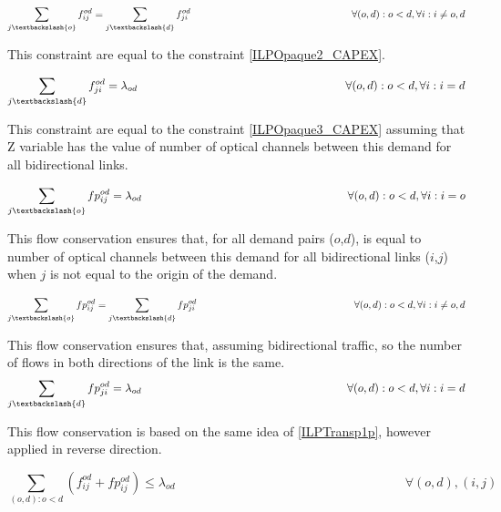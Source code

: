 \begin{equation}
\sum_{j\textbackslash \{o\}} f_{ij}^{od} = \sum_{j\textbackslash \{d\}} f_{ji}^{od} \qquad \qquad \qquad \qquad \qquad \qquad \qquad \qquad
\forall(o,d) : o < d, \forall i: i \neq o,d
\label{ILPTransp2}
\end{equation}

This constraint are equal to the constraint \ref{ILPOpaque2_CAPEX}.

\begin{equation}
\sum_{j\textbackslash \{d\}} f_{ji}^{od} = \lambda_{od}  \qquad \qquad \qquad \qquad \qquad \qquad \qquad \qquad \qquad
\forall(o,d) : o < d, \forall i: i = d
\label{ILPTransp3}
\end{equation}

This constraint are equal to the constraint \ref{ILPOpaque3_CAPEX} assuming that Z variable has the value of number of optical channels between this demand for all bidirectional links.

\begin{equation}
\sum_{j\textbackslash \{o\}} fp_{ij}^{od} = \lambda_{od} \qquad \qquad \qquad \qquad \qquad \qquad \qquad \qquad \qquad
\forall(o,d) : o < d, \forall i: i = o
\label{ILPTransp1p}
\end{equation}

This flow conservation ensures that, for all demand pairs ($o$,$d$), is equal to number of optical channels between this demand for all bidirectional links ($i$,$j$) when $j$ is not equal to the origin of the demand.

\begin{equation}
\sum_{j\textbackslash \{o\}} fp_{ij}^{od} = \sum_{j\textbackslash \{d\}} fp_{ji}^{od} \qquad \qquad \qquad \qquad \qquad \qquad \qquad \qquad
\forall(o,d) : o < d, \forall i: i \neq o,d
\label{ILPTransp2p}
\end{equation}

This flow conservation ensures that, assuming bidirectional traffic, so the number of flows in both directions of the link is the same.
\newpage
\begin{equation}
\sum_{j\textbackslash \{d\}} fp_{ji}^{od} = \lambda_{od} \qquad \qquad \qquad \qquad \qquad \qquad \qquad \qquad \qquad
\forall(o,d) : o < d, \forall i: i = d
\label{ILPTransp3p}
\end{equation}

This flow conservation is based on the same idea of \ref{ILPTransp1p}, however applied in reverse direction.

\begin{equation}
\sum_{(o,d):o<d} \left(f_{ij}^{od}  + fp_{ij}^{od}\right) \leq \lambda_{od}  \qquad \qquad \qquad \qquad \qquad \qquad \qquad \qquad \qquad
\forall (o,d), (i,j)
\label{ILPTransp4p}
\end{equation}

